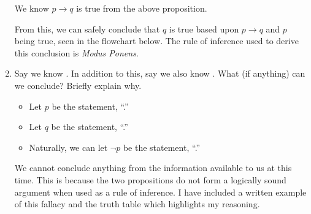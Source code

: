 \documentclass{article}
\begin{document}
\begin{enumerate}
          We know $p \rightarrow q$ is true from the above proposition.

          From this, we can safely conclude that $q$ is true based upon $p \rightarrow q$
          and $p$ being true, seen in the flowchart below. The rule of inference used to
          derive this conclusion is \textit{Modus Ponens}.

          \begin{center}
          \end{center}

          \newpage

    \item Say we know . In addition to this, say
          we also know . What (if
          anything) can we conclude? Briefly explain why.

          \begin{itemize}
              \item Let $p$ be the statement, ``.''
              \item Let $q$ be the statement, ``.''
              \item Naturally, we can let $\neg p$ be the statement, ``.''
          \end{itemize}

          We cannot conclude anything from the information available to us at this time.
          This is because the two propositions do not form a logically sound argument
          when used as a rule of inference. I have included a written example of this
          fallacy and the truth table which highlights my reasoning.


\end{enumerate}
\end{document}
